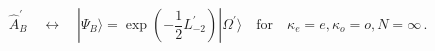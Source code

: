 \begin{equation*}
\hat{A}_{B}^{\prime }\quad \leftrightarrow \quad |\Psi _{B}\rangle =\exp
\left( -{\frac{1}{2}}L_{-2}^{\prime }\right) |\Omega ^{\prime }\rangle \quad 
\mathrm{for}\quad \kappa _{e}=e,\kappa _{o}=o,N=\infty \,.
\end{equation*}

